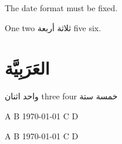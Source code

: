 \documentclass{article}
\begin{document}
The date format must be fixed.

One two \foreignlanguage{arabic}{ثلاثة أربعة} five six. 


\section{العَرَبِيَّة‎}

واحد اثنان \foreignlanguage{english}{three four} خمسة ستة

\foreignlanguage{english}{A B \today{} C D}

\foreignlanguage{english}{A B} \today{} \foreignlanguage{english}{C D}
\end{document}
